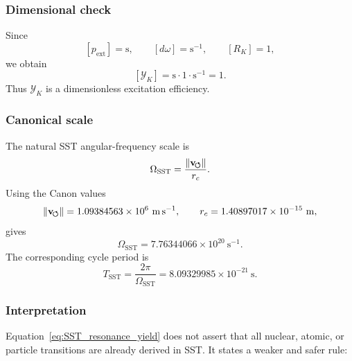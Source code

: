     \subsubsection*{Dimensional check}
        
        Since
        \[
            [p_{\mathrm{ext}}]=\mathrm{s},
            \qquad
            [d\omega]=\mathrm{s}^{-1},
            \qquad
            [R_K]=1,
        \]
        we obtain
        \[
            [\mathcal{Y}_K]
            =
            \mathrm{s}\cdot 1 \cdot \mathrm{s}^{-1}
            =
            1.
        \]
        Thus \(\mathcal{Y}_K\) is a dimensionless excitation efficiency.
    
    \subsubsection*{Canonical scale}
        
        The natural SST angular-frequency scale is
        \begin{equation}
            \Omega_{\mathrm{SST}}
            =
            \frac{\lVert\mathbf{v}_{\!\boldsymbol{\circlearrowleft}}\rVert}{r_c}.
            \label{eq:Omega_SST_scale}
        \end{equation}
        Using the Canon values
        \[
            \vnorm = 1.09384563\times10^{6}\ \mathrm{m\,s^{-1}},
            \qquad
            \rc = 1.40897017\times10^{-15}\ \mathrm{m},
        \]
        gives
        \begin{equation}
            \Omega_{\mathrm{SST}}
            =
            7.76344066\times10^{20}\ \mathrm{s^{-1}}.
            \label{eq:Omega_SST_numeric}
        \end{equation}
        The corresponding cycle period is
        \begin{equation}
            T_{\mathrm{SST}}
            =
            \frac{2\pi}{\Omega_{\mathrm{SST}}}
            =
            8.09329985\times10^{-21}\ \mathrm{s}.
            \label{eq:T_SST_numeric}
        \end{equation}
    
    \subsubsection*{Interpretation}
        
        Equation~\eqref{eq:SST_resonance_yield} does not assert that all nuclear, atomic, or particle transitions are already derived in SST. It states a weaker and safer rule:
        
